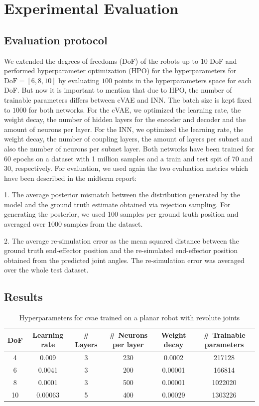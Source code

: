 \documentclass[conference]{IEEEtran}
\begin{document}
\section*{Experimental Evaluation}

\subsection*{Evaluation protocol}

We extended the degrees of freedoms (DoF) of the robots up to 10 DoF and performed hyperparameter optimization (HPO) for the hyperparameters for $ \text{DoF} = [6, 8, 10]$ by evaluating $100$ points in the hyperparameters space for each DoF. But now it is important to mention that due to HPO, the number of trainable parameters differs between cVAE and INN. The batch size is kept fixed to $1000$ for both networks.
For the cVAE, we optimized the learning rate, the weight decay, the number of hidden layers for the encoder and decoder and the amount of neurons per layer. For the INN, we optimized the learning rate, the weight decay, the number of coupling layers, the amount of layers per subnet and also the number of neurons per subnet layer.
Both networks have been trained for 60 epochs on a dataset with 1 million samples and a train and test spit of 70 and 30, respectively. For evaluation, we used again the two evaluation metrics which have been described in the midterm report:

1. The average posterior mismatch between the distribution generated by the model and the ground truth estimate obtained via rejection sampling. For generating the posterior, we used 100 samples per ground truth position and averaged over 1000 samples from the dataset.

2. The average re-simulation error as the mean squared distance between the ground truth end-effector position and the re-simulated end-effector position obtained from the predicted joint angles. The re-simulation error was averaged over the whole test dataset.

\subsection*{Results}

\begin{table}[h]
\caption{Hyperparameters for cvae trained on a planar robot with revolute joints}
\label{tab:results:cvae}
\centering
\begin{tabular}{|c|c|c|c|c|c|}
\hline
DoF & Learning rate & \# Layers & \# Neurons per layer & Weight decay & \# Trainable parameters \\
\hline
4  & 0.009 & 3 & 230 & 0.0002 & 217128 \\
6  & 0.0041 & 3 & 200 & 0.00001 & 166814 \\
8  & 0.0001 & 3 & 500 & 0.00001 & 1022020 \\
10  & 0.00063 & 5 & 400 & 0.00029 & 1303226 \\
\hline
\end{tabular}
\end{table}
\end{document}
